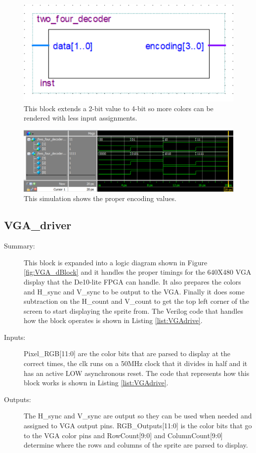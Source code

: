 \documentclass[a4paper]{article}
\begin{document}
\begin{figure}[H]
    \centering
    \includegraphics[width=.5\textwidth]{Images/matthew_blocks/twofourdecode.png}
    \caption{This block extends a 2-bit value to 4-bit so more colors can be rendered with less input assignments.}
    \label{fig:twofordec}
\end{figure}

\begin{figure}[H]
    \centering
    \includegraphics[width=5.91in]{Images/matthew_sim/two_four_decoderSim.png}
    \caption{This simulation shows the proper encoding values.}
    \label{fig:twofordecSim}
\end{figure}

\subsection{VGA\_driver}
\begin{description}
    \item[Summary: ] This block is expanded into a logic diagram shown in Figure \ref{fig:VGA_dBlock} and it handles the proper timings for the 640X480 VGA display that the De10-lite FPGA can handle. It also prepares the colors and H\_sync and V\_sync to be output to the VGA. Finally it does some subtraction on the H\_count and V\_count to get the top left corner of the screen to start displaying the sprite from. The Verilog code that handles how the block operates is shown in Listing \ref{list:VGAdrive}.
    
    \item[Inputs: ] Pixel\_RGB[11:0] are the color bits that are parsed to display at the correct times, the clk runs on a 50MHz clock that it divides in half and it has an active LOW asynchronous reset. The code that represents how this block works is shown in Listing \ref{list:VGAdrive}.
    
    \item[Outputs: ] The H\_sync and V\_sync are output so they can be used when needed and assigned to VGA output pins. RGB\_Outputs[11:0] is the color bits that go to the VGA color pins and RowCount[9:0] and ColumnCount[9:0] determine where the rows and columns of the sprite are parsed to display.
\end{description}
\end{document}
